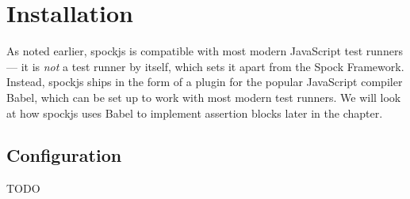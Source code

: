 \section{Installation}
As noted earlier, spockjs is compatible with most modern JavaScript test runners
--- it is \textit{not} a test runner by itself,
which sets it apart from the Spock Framework.
Instead, spockjs ships in the form of a plugin for the popular JavaScript compiler Babel,
\autocite{Babel}
which can be set up to work with most modern test runners.
\autocite{BabelSetupDoc}
We will look at how spockjs uses Babel to implement assertion blocks later in the chapter.

\subsection{Configuration}
TODO
